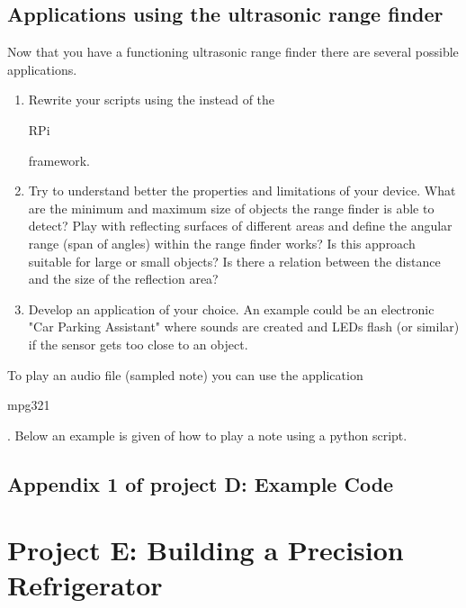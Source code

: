 \subsection{Applications using the ultrasonic range finder}

Now that you have a functioning ultrasonic range finder there are several possible applications.

\begin{enumerate}
\item  Rewrite  your scripts using the  \webiopi instead of the \begin{tt}RPi\end{tt} framework.

\item	Try to understand better the properties and limitations of your device. What are the minimum and maximum size of objects the range finder is able to detect? Play with reflecting surfaces of different areas and define the angular range (span of angles) within the range finder works? Is this approach suitable for large or small objects? Is there a relation between the distance and the size of the reflection area?

\item Develop an application of your choice. An example could be an electronic "Car Parking Assistant" where sounds are created and LEDs flash (or similar) if the sensor gets too close to an object.

\end{enumerate}

To play an audio file (sampled note) you can use the application \begin{tt}mpg321\end{tt}. Below an example is given of how to play a note using a python script.\\


\vspace*{-0.5cm}




\subsection*{Appendix 1 of project D: Example Code}




\newpage
\section{Project E: Building a Precision Refrigerator}

